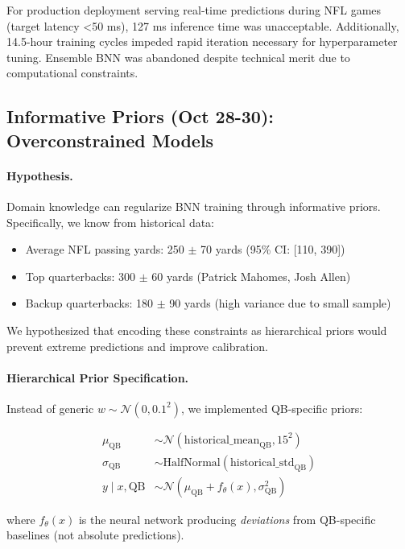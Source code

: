 For production deployment serving real-time predictions during NFL games (target latency <50 ms), 127 ms inference time was unacceptable. Additionally, 14.5-hour training cycles impeded rapid iteration necessary for hyperparameter tuning. Ensemble BNN was abandoned despite technical merit due to computational constraints.

\subsection{Informative Priors (Oct 28-30): Overconstrained Models}

\paragraph{Hypothesis.}
Domain knowledge can regularize BNN training through informative priors. Specifically, we know from historical data:
\begin{itemize}[itemsep=2pt,parsep=0pt]
    \item Average NFL passing yards: 250 $\pm$ 70 yards (95\% CI: [110, 390])
    \item Top quarterbacks: 300 $\pm$ 60 yards (Patrick Mahomes, Josh Allen)
    \item Backup quarterbacks: 180 $\pm$ 90 yards (high variance due to small sample)
\end{itemize}

We hypothesized that encoding these constraints as hierarchical priors would prevent extreme predictions and improve calibration.

\paragraph{Hierarchical Prior Specification.}
Instead of generic $w \sim \mathcal{N}(0, 0.1^2)$, we implemented QB-specific priors:

\begin{align}
\mu_{\text{QB}} &\sim \mathcal{N}(\text{historical\_mean}_{\text{QB}}, 15^2) \\
\sigma_{\text{QB}} &\sim \text{HalfNormal}(\text{historical\_std}_{\text{QB}}) \\
y \mid x, \text{QB} &\sim \mathcal{N}(\mu_{\text{QB}} + f_{\theta}(x), \sigma^2_{\text{QB}})
\end{align}

where $f_{\theta}(x)$ is the neural network producing \textit{deviations} from QB-specific baselines (not absolute predictions).

